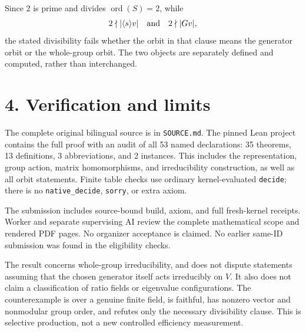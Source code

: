 \documentclass[10pt]{article}
\begin{document}
Since $2$ is prime and divides $\operatorname{ord}(S)=2$, while
\[
2\nmid|\langle s\rangle v|\quad\hbox{and}\quad 2\nmid|Gv|,
\]
the stated divisibility fails whether the orbit in that clause means the generator orbit or the whole-group orbit. The two objects are separately defined and computed, rather than interchanged.

\section*{4. Verification and limits}
The complete original bilingual source is in \texttt{SOURCE.md}. The pinned Lean project contains the full proof with an audit of all 53 named declarations: 35 theorems, 13 definitions, 3 abbreviations, and 2 instances. This includes the representation, group action, matrix homomorphisms, and irreducibility construction, as well as all orbit statements. Finite table checks use ordinary kernel-evaluated \texttt{decide}; there is no \texttt{native\_decide}, \texttt{sorry}, or extra axiom.

The submission includes source-bound build, axiom, and full fresh-kernel receipts. Worker and separate supervising AI review the complete mathematical scope and rendered PDF pages. No organizer acceptance is claimed. No earlier same-ID submission was found in the eligibility checks.

The result concerns whole-group irreducibility, and does not dispute statements assuming that the chosen generator itself acts irreducibly on $V$. It also does not claim a classification of ratio fields or eigenvalue configurations. The counterexample is over a genuine finite field, is faithful, has nonzero vector and nonmodular group order, and refutes only the necessary divisibility clause. This is selective production, not a new controlled efficiency measurement.
\end{document}
